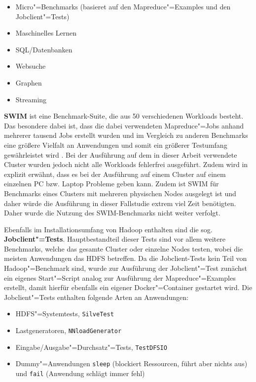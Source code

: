 \begin{itemize}
    \item Micro"=Benchmarks (basieret auf den Mapreduce"=Examples und den Jobclient"=Tests)
    \item Maschinelles Lernen
    \item SQL/Datenbanken
    \item Websuche
    \item Graphen
    \item Streaming
\end{itemize}

\textbf{\ac{SWIM}} ist eine Benchmark-Suite, die aus 50 verschiedenen Workloads besteht. Das besondere dabei ist, dass die dabei verwendeten Mapreduce"=Jobs anhand mehrerer tausend Jobs erstellt wurden und im Vergleich zu anderen Benchmarks eine größere Vielfalt an Anwendungen und somit ein größerer Testumfang gewährleistet wird \cite{SwimWikiHome}. Bei der Ausführung auf dem in dieser Arbeit verwendete Cluster wurden jedoch nicht alle Workloads fehlerfrei ausgeführt. Zudem wird in \cite{InriaTutorial} explizit erwähnt, dass es bei der Ausführung auf einem Cluster auf einem einzelnen PC bzw. Laptop Probleme geben kann. Zudem ist SWIM für Benchmarks eines Clusters mit mehreren physischen Nodes ausgelegt ist und daher würde die Ausführung in dieser Fallstudie extrem viel Zeit benötigten. Daher wurde die Nutzung des SWIM-Benchmarks nicht weiter verfolgt.

Ebenfalls im Installationsumfang von Hadoop enthalten sind die sog. \textbf{Jobclient"=Tests}. Hauptbestandteil dieser Tests sind vor allem weitere Benchmarks, welche das gesamte Cluster oder einzelne Nodes testen, wobei die meisten Anwendungen das HDFS betreffen. Da die Jobclient-Tests kein Teil von Hadoop"=Benchmark sind, wurde zur Ausführung der Jobclient"=Test zunächst ein eigenes Start"=Script analog zur Ausführung der Mapreduce"=Examples erstellt, damit hierfür ebenfalls ein eigener Docker"=Container gestartet wird. Die Jobclient"=Tests enthalten \uA folgende Arten an Anwendungen:

\begin{itemize}
    \item HDFS"=Systemtests, \zB \texttt{SilveTest}
    \item Lastgeneratoren, \zB \texttt{NNloadGenerator}
    \item Eingabe/Ausgabe"=Durchsatz"=Tests, \zB \texttt{TestDFSIO}
    \item Dummy"=Anwendungen \texttt{sleep} (blockiert Ressourcen, führt aber nichts aus) und \texttt{fail} (Anwendung schlägt immer fehl)
\end{itemize}